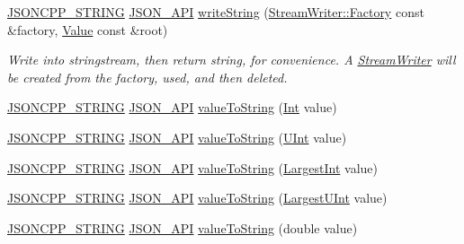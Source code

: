 \begin{DoxyCompactItemize}
\hyperlink{json_8h_a1e723f95759de062585bc4a8fd3fa4be}{J\+S\+O\+N\+C\+P\+P\+\_\+\+S\+T\+R\+I\+NG} \hyperlink{json_8h_a1d61ffde86ce1a18fd83194ff0d9a206}{J\+S\+O\+N\+\_\+\+A\+PI} \hyperlink{namespace_json_a00820c0084189e2a7533531c0f250e3f}{write\+String} (\hyperlink{class_json_1_1_stream_writer_1_1_factory}{Stream\+Writer\+::\+Factory} const \&factory, \hyperlink{class_json_1_1_value}{Value} const \&root)
\begin{DoxyCompactList}\small\item\em Write into stringstream, then return string, for convenience. A \hyperlink{class_json_1_1_stream_writer}{Stream\+Writer} will be created from the factory, used, and then deleted. \end{DoxyCompactList}\item 
\hyperlink{json_8h_a1e723f95759de062585bc4a8fd3fa4be}{J\+S\+O\+N\+C\+P\+P\+\_\+\+S\+T\+R\+I\+NG} \hyperlink{json_8h_a1d61ffde86ce1a18fd83194ff0d9a206}{J\+S\+O\+N\+\_\+\+A\+PI} \hyperlink{namespace_json_a498503e8f49d6a3811e3c9f6757da60d}{value\+To\+String} (\hyperlink{namespace_json_a08122e8005b706d982e48cca1e2119c7}{Int} value)
\item 
\hyperlink{json_8h_a1e723f95759de062585bc4a8fd3fa4be}{J\+S\+O\+N\+C\+P\+P\+\_\+\+S\+T\+R\+I\+NG} \hyperlink{json_8h_a1d61ffde86ce1a18fd83194ff0d9a206}{J\+S\+O\+N\+\_\+\+A\+PI} \hyperlink{namespace_json_ab2cb54f173193c8d27c3eb7f10b6e79a}{value\+To\+String} (\hyperlink{namespace_json_a800fb90eb6ee8d5d62b600c06f87f7d4}{U\+Int} value)
\item 
\hyperlink{json_8h_a1e723f95759de062585bc4a8fd3fa4be}{J\+S\+O\+N\+C\+P\+P\+\_\+\+S\+T\+R\+I\+NG} \hyperlink{json_8h_a1d61ffde86ce1a18fd83194ff0d9a206}{J\+S\+O\+N\+\_\+\+A\+PI} \hyperlink{namespace_json_a4732517cb28d203cfd4354d05952a81b}{value\+To\+String} (\hyperlink{namespace_json_a218d880af853ce786cd985e82571d297}{Largest\+Int} value)
\item 
\hyperlink{json_8h_a1e723f95759de062585bc4a8fd3fa4be}{J\+S\+O\+N\+C\+P\+P\+\_\+\+S\+T\+R\+I\+NG} \hyperlink{json_8h_a1d61ffde86ce1a18fd83194ff0d9a206}{J\+S\+O\+N\+\_\+\+A\+PI} \hyperlink{namespace_json_a6283ea3db02efe9104ae6baff698245a}{value\+To\+String} (\hyperlink{namespace_json_ae202ecad69725e23443f465e257456d0}{Largest\+U\+Int} value)
\item 
\hyperlink{json_8h_a1e723f95759de062585bc4a8fd3fa4be}{J\+S\+O\+N\+C\+P\+P\+\_\+\+S\+T\+R\+I\+NG} \hyperlink{json_8h_a1d61ffde86ce1a18fd83194ff0d9a206}{J\+S\+O\+N\+\_\+\+A\+PI} \hyperlink{namespace_json_a3cf0c8dbbdb898c4a6fad54670b34bd1}{value\+To\+String} (double value)

\end{DoxyCompactItemize}
